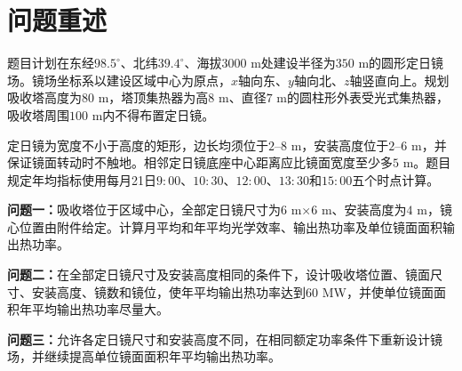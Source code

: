 \section{问题重述}
题目计划在东经$98.5^\circ$、北纬$39.4^\circ$、海拔$3000$ m处建设半径为$350$ m的圆形定日镜场。镜场坐标系以建设区域中心为原点，$x$轴向东、$y$轴向北、$z$轴竖直向上。规划吸收塔高度为$80$ m，塔顶集热器为高$8$ m、直径$7$ m的圆柱形外表受光式集热器，吸收塔周围$100$ m内不得布置定日镜。

定日镜为宽度不小于高度的矩形，边长均须位于$2$--$8$ m，安装高度位于$2$--$6$ m，并保证镜面转动时不触地。相邻定日镜底座中心距离应比镜面宽度至少多$5$ m。题目规定年均指标使用每月21日$9{:}00$、$10{:}30$、$12{:}00$、$13{:}30$和$15{:}00$五个时点计算。

\textbf{问题一：}吸收塔位于区域中心，全部定日镜尺寸为$6$ m$\times6$ m、安装高度为$4$ m，镜心位置由附件给定。计算月平均和年平均光学效率、输出热功率及单位镜面面积输出热功率。

\textbf{问题二：}在全部定日镜尺寸及安装高度相同的条件下，设计吸收塔位置、镜面尺寸、安装高度、镜数和镜位，使年平均输出热功率达到$60$ MW，并使单位镜面面积年平均输出热功率尽量大。

\textbf{问题三：}允许各定日镜尺寸和安装高度不同，在相同额定功率条件下重新设计镜场，并继续提高单位镜面面积年平均输出热功率。
